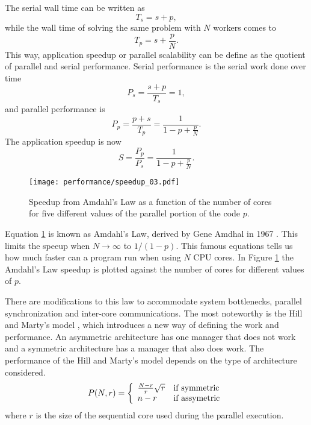 	The serial wall time can be written as
\begin{equation}
	T_s = s + p,
\end{equation}	
while the wall time of solving the same problem with $N$ workers comes to
\begin{equation}
	T_p = s + \frac{p}{N}.
\end{equation}
This way, application speedup or parallel scalability can be define as the quotient of parallel and serial performance. Serial performance is the serial work done over time
\begin{equation}
	P_s = \frac{s+p}{T_s} = 1,
\end{equation} 
and parallel performance is
\begin{equation}
	P_p = \frac{p+s}{T_p} = \frac{1}{1-p+\frac{p}{N}}.
\end{equation}
The application speedup is now
\begin{equation}\label{amd_law}
	S = \frac{P_p}{P_s} = \frac{1}{1-p+\frac{p}{N}}.
\end{equation}

\begin{figure}[h]
	\centering
	\texttt{[image: performance/speedup\_03.pdf]}
	\caption{Speedup from Amdahl's Law as a function of the number of cores for five different values of the parallel portion of the code $p$.}
	\label{amd_law}
\end{figure}

Equation \ref{amd_law} is known as Amdahl's Law, derived by Gene Amdhal in 1967 \cite{Amdahl1967}. This limits the speeup when $N \rightarrow \infty$ to $1/(1-p)$. This famous equations tells us how much faster can a program run when using $N$ CPU cores. In Figure \ref{amd_law} the Amdahl's Law speedup is plotted against the number of cores for different values of $p$.

	There are modifications to this law \cite{On2014} to accommodate system bottlenecks, parallel synchronization and inter-core communications. The most noteworthy is the Hill and Marty's model \cite{Hill2008}, which introduces a new way of defining the work and performance. An asymmetric architecture has one manager that does not work and a symmetric architecture has a manager that also does work. The performance of the Hill and Marty's model depends on the type of architecture considered. 
\begin{equation}
		P(N, r) = \left\{ \begin{array}{ll}  \frac{N-r}{r} \sqrt{r}  & \mbox{if } \text{symmetric} \\ n-r & \mbox{if } \text{assymetric} \end{array} \right.
\end{equation}
where $r$ is the size of the sequential core used during the parallel execution. 


